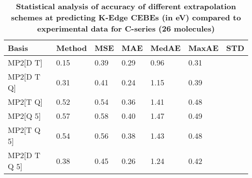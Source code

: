\begin{table}
  \caption{\textbf{Statistical analysis of accuracy of different extrapolation schemes at predicting K-Edge CEBEs (in eV) compared to experimental data for C-series (26 molecules)}}
  \begin{tabular}{l l l l l l l }
    \toprule
    \textbf{Basis} & \textbf{Method} & \textbf{MSE} & \textbf{MAE} & \textbf{MedAE} & \textbf{MaxAE} & \textbf{STD} \\ 
    \midrule
    MP2[D T] & 0.15 & 0.39 & 0.29 & 0.96 & 0.31 \\ 
    MP2[D T Q] & 0.31 & 0.41 & 0.24 & 1.15 & 0.39 \\ 
    MP2[T Q] & 0.52 & 0.54 & 0.36 & 1.41 & 0.48 \\ 
    MP2[Q 5] & 0.57 & 0.58 & 0.40 & 1.47 & 0.49 \\ 
    MP2[T Q 5] & 0.54 & 0.56 & 0.38 & 1.43 & 0.48 \\ 
    MP2[D T Q 5] & 0.38 & 0.45 & 0.26 & 1.24 & 0.42 \\ 
    \bottomrule
  \end{tabular}
\end{table}
